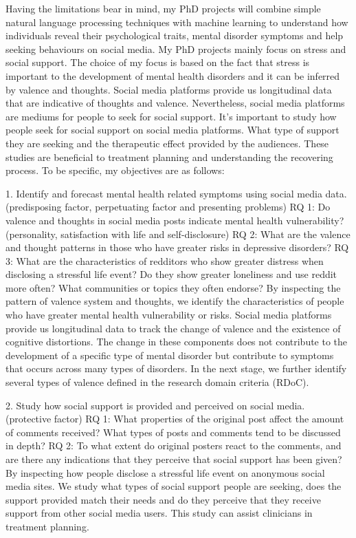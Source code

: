 Having the limitations bear in mind, my PhD projects will combine simple natural language processing techniques with machine learning to understand how individuals reveal their psychological traits, mental disorder symptoms and help seeking behaviours on social media. My PhD projects mainly focus on stress and social support. The choice of my focus is based on the fact that stress is important to the development of mental health disorders and it can be inferred by valence and thoughts. Social media platforms provide us longitudinal data that are indicative of thoughts and valence. Nevertheless, social media platforms are mediums for people to seek for social support. It's important to study how people seek for social support on social media platforms. What type of support they are seeking and the therapeutic effect provided by the audiences. These studies are beneficial to treatment planning and understanding the recovering process. To be specific, my objectives are as follows:

1. Identify and forecast mental health related symptoms using social media data. (predisposing factor, perpetuating factor and presenting problems)
RQ 1: Do valence and thoughts in social media posts indicate mental health vulnerability? (personality, satisfaction with life and self-disclosure)
RQ 2: What are the valence and thought patterns in those who have greater risks in depressive disorders?
RQ 3: What are the characteristics of redditors who show greater distress when disclosing a stressful life event? Do they show greater loneliness and use reddit more often? What communities or topics they often endorse?
By inspecting the pattern of valence system and thoughts, we identify the characteristics of people who have greater mental health vulnerability or risks. Social media platforms provide us longitudinal data to track the change of valence and the existence of cognitive distortions. The change in these components does not contribute to the development of a specific type of mental disorder but contribute to symptoms that occurs across many types of disorders. In the next stage, we further identify several types of valence defined in the research domain criteria (RDoC). 

2. Study how social support is provided and perceived on social media. (protective factor)
RQ 1: What properties of the original post affect the amount of comments received? What types of posts and comments tend to be discussed in depth? 
RQ 2: To what extent do original posters react to the comments, and are there any indications that they perceive that social support has been given?
By inspecting how people disclose a stressful life event on anonymous social media sites. We study what types of social support people are seeking, does the support provided match their needs and do they perceive that they receive support from other social media users. This study can assist clinicians in treatment planning.

